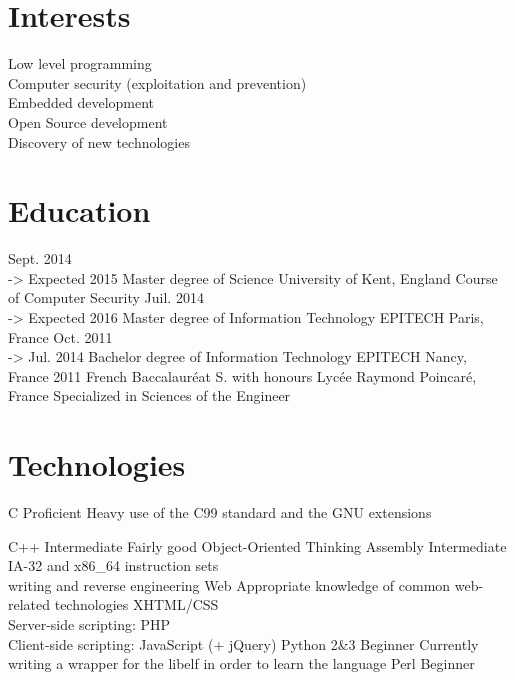 \documentclass[]{friggeri-cv}
\begin{document}
\section{Interests}

Low level programming\\
Computer security (exploitation and prevention)\\
Embedded development\\
Open Source development\\
Discovery of new technologies

\section{Education}

\begin{entrylist}
  \entry
    {Sept. 2014\\-> Expected 2015}
    {Master degree of Science}
    {University of Kent, England}
    {Course of Computer Security}
  \entry
    {Juil. 2014\\-> Expected 2016}
    {Master degree of Information Technology}
    {EPITECH Paris, France}
    {}
  \entry
    {Oct. 2011\\-> Jul. 2014}
    {Bachelor degree of Information Technology}
    {EPITECH Nancy, France}
    {}
  \entry
    {2011}
    {French Baccalauréat S. with honours}
    {Lycée Raymond Poincaré, France}
    {Specialized in Sciences of the Engineer}
\end{entrylist}

\section{Technologies}
\begin{entrylist}
  \entry
    {C}
    {Proficient}
    {}
    {Heavy use of the C99 standard and the GNU extensions}
\end{entrylist}      %
\begin{entrylist}    %
  \entry
    {C++}
    {Intermediate}
    {}
    {Fairly good Object-Oriented Thinking}
  \entry
    {Assembly}
    {Intermediate}
    {}
    {IA-32 and x86\_64 instruction sets\\
    writing and reverse engineering}
  \entry
    {Web}
    {Appropriate knowledge of common web-related technologies}
    {}
    {XHTML/CSS\\
        Server-side scripting: PHP\\
        Client-side scripting: JavaScript (+ jQuery)
    }
  \entry
    {Python 2\&3}
    {Beginner}
    {}
    {Currently writing a wrapper for the libelf in order to learn the language}
  \entry
    {Perl}
    {Beginner}
    {}
    {}
\end{entrylist}
\end{document}
